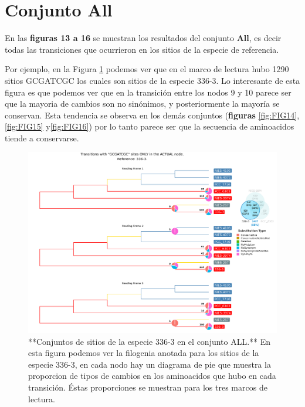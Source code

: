 \documentclass[
]{book}
\begin{document}
\hypertarget{conjunto-all}{%
\section{Conjunto All}\label{conjunto-all}}

En las \textbf{figuras 13 a 16} se muestran los resultados del conjunto \textbf{All}, es decir todas las transiciones que ocurrieron en los sitios de la especie de referencia.

Por ejemplo, en la Figura \ref{fig:FIG13} podemos ver que en el marco de lectura hubo 1290 sitios GCGATCGC los cuales son sitios de la especie 336-3. Lo interesante de esta figura es que podemos ver que en la transición entre los nodos 9 y 10 parece ser que la mayoria de cambios son no sinónimos, y posteriormente la mayoría se conservan. Esta tendencia se observa en los demás conjuntos (\textbf{figuras} \ref{fig:FIG14},\ref{fig:FIG15} y\ref{fig:FIG16}) por lo tanto parece ser que la secuencia de aminoacidos tiende a conservarse.

\begin{figure}

{\centering \includegraphics[width=1.2\linewidth]{Clados/Calothrix_B/figures/A/GCGATCGC/Actual/336-3_Actual_A_tree} 

}

\caption{**Conjuntos de sitios de la especie 336-3 en el conjunto ALL.** En esta figura podemos ver la filogenia anotada para los sitios de la especie 336-3, en cada nodo hay un diagrama de pie que muestra la proporcion de tipos de cambios en los aminoacidos que hubo en cada transición. Éstas proporciones se muestran para los tres marcos de lectura.}\label{fig:FIG13}
\end{figure}
\end{document}
